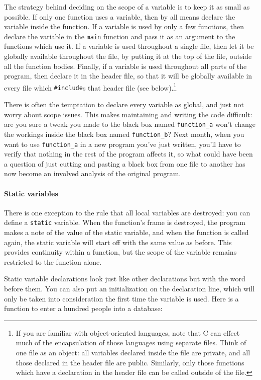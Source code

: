 \documentclass[12pt]{article}
\makeatletter
\def\ttind#1{\index{#1@{\tt #1}}{\tt #1}}
\makeatother
\begin{document}
The strategy behind deciding on the scope of a variable is
to keep it as small as possible. If only one function uses a variable,
then by all means declare the variable inside the function.
If a variable is used by only a few functions,
then declare the variable in the {\tt main} function and pass it as an
argument to the functions which use it. If a variable is used throughout
a single file, then let it be globally available throughout the file, by
putting it at the top of the file, outside all the function bodies. Finally,
if a variable is used throughout all parts of the program, then declare it in
the header file, so that it will be globally available in every
file which {\tt \#include}s that header file (see below).\footnote{If
you are familiar with object-oriented languages, note that C can effect
much of the encapsulation of those languages using separate files. Think
of one file as an object: all variables declared inside the file are
private, and all those declared in the header file are public. Similarly,
only those functions which have a declaration in the header file can be
called outside of the file.}

There is often the temptation to declare every variable as global, and
just not worry about scope issues. This makes maintaining and writing
the code difficult: are you sure a tweak you made to the black box named
{\tt function\_a} won't change the workings inside the black box named
{\tt function\_b}? Next month, when you want to use {\tt function\_a}
in a new program you've just written, you'll have to verify that nothing
in the rest of the program affects it, so what could have been a question
of just cutting and pasting a black box from one file to another has
now become an involved analysis of the original program.  

\paragraph{Static variables} There is one exception to the rule that
all local variables are destroyed: you can define a {\tt static}
variable. When the function's frame is destroyed, the program makes a
note of the value of the  static variable, and when the function is called
again, the static variable will start off with the same value
as before. This provides continuity within a function, but the scope
of the variable remains restricted to the function alone.

Static variable declarations look just like other declarations but with
the word \ttind{static} before them. You can also put an initialization on
the declaration line, which will only be taken into consideration the
first time the variable is used. Here is a function to enter a hundred
people into a database:
\end{document}
